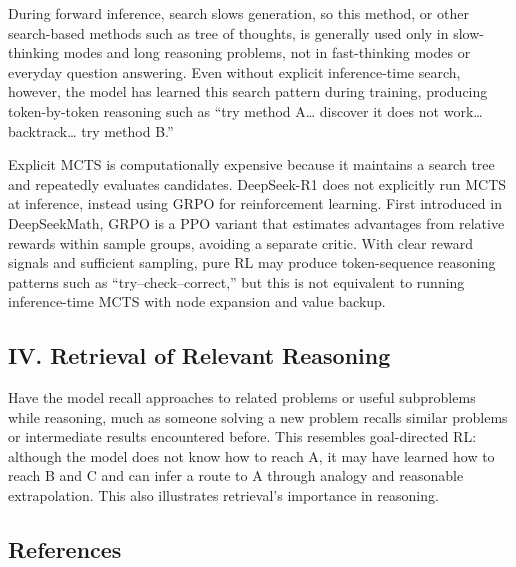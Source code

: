 During forward inference, search slows generation, so this method, or other search-based methods such as tree of thoughts, is generally used only in slow-thinking modes and long reasoning problems, not in fast-thinking modes or everyday question answering. Even without explicit inference-time search, however, the model has learned this search pattern during training, producing token-by-token reasoning such as ``try method A\ldots{} discover it does not work\ldots{} backtrack\ldots{} try method B.''

Explicit MCTS is computationally expensive because it maintains a search tree and repeatedly evaluates candidates. DeepSeek-R1 does not explicitly run MCTS at inference, instead using GRPO for reinforcement learning. First introduced in DeepSeekMath, GRPO is a PPO variant that estimates advantages from relative rewards within sample groups, avoiding a separate critic. With clear reward signals and sufficient sampling, pure RL may produce token-sequence reasoning patterns such as ``try--check--correct,'' but this is not equivalent to running inference-time MCTS with node expansion and value backup.

\hypertarget{iv.-retrieval-of-relevant-reasoning}{%
\subsection{IV. Retrieval of Relevant Reasoning}\label{iv.-retrieval-of-relevant-reasoning}}

Have the model recall approaches to related problems or useful subproblems while reasoning, much as someone solving a new problem recalls similar problems or intermediate results encountered before. This resembles goal-directed RL: although the model does not know how to reach A, it may have learned how to reach B and C and can infer a route to A through analogy and reasonable extrapolation. This also illustrates retrieval's importance in reasoning.

\FloatBarrier
{}
\hypertarget{references-120}{%
\subsection{References}\label{references-120}}

